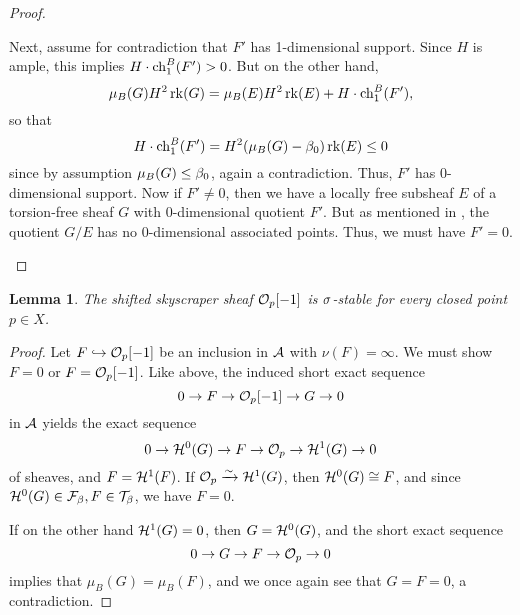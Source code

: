 \documentclass[letterpaper,11pt]{amsart}%
\newtheorem{lem}[thm]{Lemma}
\theoremstyle{remark}
\begin{document}
\begin{proof}
\begin{itemize}
        Next, assume for contradiction that $F'$ has 1-dimensional support. Since $H$ is ample, this implies $H \cdot \operatorname{\mathrm{ch}}^B_1(F') > 0$. But on the other hand, 
        \[ \mu_B(G) H^2 \operatorname{\mathrm{rk}}(G) = \mu_B(E) H^2 \operatorname{\mathrm{rk}}(E) + H \cdot \operatorname{\mathrm{ch}}^B_1(F'), \]
        so that
        \[ H \cdot \operatorname{\mathrm{ch}}^B_1(F') = H^2 (\mu_B(G) - \beta_0)\operatorname{\mathrm{rk}}(E) \le 0 \]
        since by assumption $\mu_B(G) \le \beta_0$, again a contradiction. Thus, $F'$ has 0-dimensional support. Now if $F' \neq 0$, then we have a locally free subsheaf $E$ of a torsion-free sheaf $G$ with 0-dimensional quotient $F'$. But as mentioned in \cite[Example 1.1.16]{HL}, the quotient $G/E$ has no 0-dimensional associated points. Thus, we must have $F' = 0$.
    \end{itemize} 
\end{proof}

\begin{lem}\label{skyscraperIsSigmaStable}
    The shifted skyscraper sheaf $\mathcal{O}_p[-1]$ is $\sigma$-stable for every closed point $p \in X$.
\end{lem}
\begin{proof}
    Let $F \hookrightarrow \mathcal{O}_p[-1]$ be an inclusion in $\mathcal{A}$ with $\nu(F) = \infty$. We must show $F = 0$ or $F = \mathcal{O}_p[-1]$. Like above, the induced short exact sequence
    \[ 0 \to F \to \mathcal{O}_p[-1] \to G \to 0 \]
    in $\mathcal{A}$ yields the exact sequence
    \[ 0 \to \mathcal{H}^0(G) \to F \to \mathcal{O}_p \to \mathcal{H}^1(G) \to 0 \]
    of sheaves, and $F = \mathcal{H}^1(F)$. If $\mathcal{O}_p \xrightarrow{\sim} \mathcal{H}^1(G)$, then $\mathcal{H}^0(G) \cong F$, and since $\mathcal{H}^0(G) \in \mathcal{F}_\beta, F \in \mathcal{T}_\beta$, we have $F = 0$.
    
    If on the other hand $\mathcal{H}^1(G) = 0$, then $G = \mathcal{H}^0(G)$, and the short exact sequence
    \[ 0 \to G \to F \to \mathcal{O}_p \to 0 \]
    implies that $\mu_B(G) = \mu_B(F)$, and we once again see that $G = F = 0$, a contradiction.
\end{proof}

\end{document}
